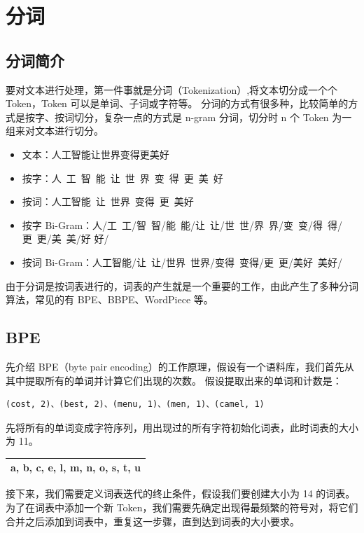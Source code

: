 \section{分词}
\subsection{分词简介}
要对文本进行处理，第一件事就是分词（Tokenization）,将文本切分成一个个 Token，Token 可以是单词、子词或字符等。
分词的方式有很多种，比较简单的方式是按字、按词切分，复杂一点的方式是 n-gram 分词，切分时 n 个 Token 为一组来对文本进行切分。
\begin{itemize}
	\item 文本：人工智能让世界变得更美好
	\item 按字：人~工~智~能~让~世~界~变~得~更~美~好
	\item 按词：人工智能~让~世界~变得~更~美好
	\item 按字 Bi-Gram：人/工~工/智~智/能~能/让~让/世~世/界~界/变~变/得~得/更~更/美~美/好 好/
	\item 按词 Bi-Gram：人工智能/让~让/世界~世界/变得~变得/更~更/美好~美好/
\end{itemize}

由于分词是按词表进行的，词表的产生就是一个重要的工作，由此产生了多种分词算法，常见的有 BPE、BBPE、WordPiece 等。

\subsection{BPE}
先介绍 BPE（byte pair encoding）的工作原理，假设有一个语料库，我们首先从其中提取所有的单词并计算它们出现的次数。
假设提取出来的单词和计数是：

\begin{verbatim}
(cost, 2)、(best, 2)、(menu, 1)、(men, 1)、(camel, 1)
\end{verbatim}

先将所有的单词变成字符序列，用出现过的所有字符初始化词表，此时词表的大小为 11。

\begin{table}[H]
	\centering
	\begin{tabular}{|l|}
		\hline
		a, b, c, e, l, m, n, o, s, t, u \\
		\hline
	\end{tabular}
\end{table}

接下来，我们需要定义词表迭代的终止条件，假设我们要创建大小为 14 的词表。
为了在词表中添加一个新 Token，我们需要先确定出现得最频繁的符号对，将它们合并之后添加到词表中，重复这一步骤，直到达到词表的大小要求。

